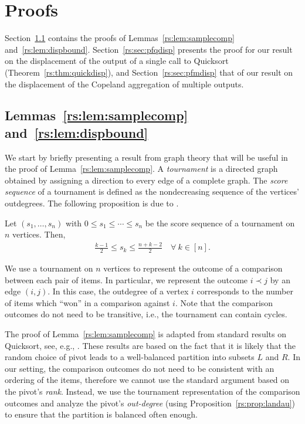 \section{Proofs}  %
\label{rs:app:proofs}

Section~\ref{rs:sec:pflemmas} contains the proofs of Lemmas~\ref{rs:lem:samplecomp} and~\ref{rs:lem:dispbound}.
Section~\ref{rs:sec:pfqdisp} presents the proof for our result on the displacement of the output of a single call to Quicksort (Theorem~\ref{rs:thm:quickdisp}), and Section~\ref{rs:sec:pfmdisp} that of our result on the displacement of the Copeland aggregation of multiple outputs.

\subsection{Lemmas~\ref{rs:lem:samplecomp} and~\ref{rs:lem:dispbound}}
\label{rs:sec:pflemmas}

We start by briefly presenting a result from graph theory that will be useful in the proof of Lemma~\ref{rs:lem:samplecomp}.
A \emph{tournament} is a directed graph obtained by assigning a direction to every edge of a complete graph.
The \emph{score sequence} of a tournament is defined as the nondecreasing sequence of the vertices' outdegrees.
The following proposition is due to \citet{landau1953dominance}.

\begin{proposition}
\label{rs:prop:landau}
Let $(s_1, \ldots, s_n)$ with $0 \le s_1 \le \cdots \le s_n$ be the score sequence of a tournament on $n$ vertices.
Then,
\begin{align*}
\frac{k - 1}{2} \le s_k \le \frac{n + k - 2}{2} \quad \forall\ k \in [n].
\end{align*}
\end{proposition}

We use a tournament on $n$ vertices to represent the outcome of a comparison between each pair of items.
In particular, we represent the outcome $i \prec j$ by an edge $(i, j)$.
In this case, the outdegree of a vertex $i$ corresponds to the number of items which ``won'' in a comparison against $i$.
Note that the comparison outcomes do not need to be transitive, i.e., the tournament can contain cycles.

The proof of Lemma~\ref{rs:lem:samplecomp} is adapted from standard results on Quicksort, see, e.g., \citet[][Section 3.3.3]{dubhashi2009concentration}.
These results are based on the fact that it is likely that the random choice of pivot leads to a well-balanced partition into subsets $L$ and $R$.
In our setting, the comparison outcomes do not need to be consistent with an ordering of the items, therefore we cannot use the standard argument based on the pivot's \emph{rank}.
Instead, we use the tournament representation of the comparison outcomes and analyze the pivot's \emph{out-degree} (using Proposition~\ref{rs:prop:landau}) to ensure that the partition is balanced often enough.

